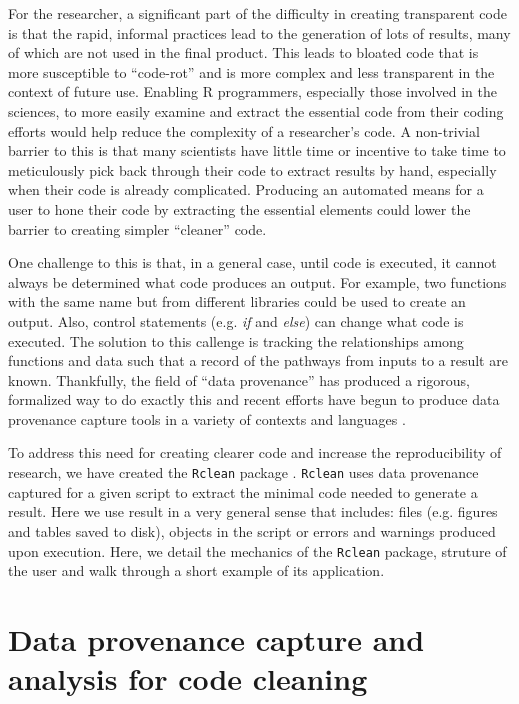 For the researcher, a significant part of the difficulty in creating
transparent code is that the rapid, informal practices lead to the
generation of lots of results, many of which are not used in the final
product. This leads to bloated code that is more susceptible to
``code-rot'' and is more complex and less transparent in the context
of future use. Enabling R programmers, especially those involved in
the sciences, to more easily examine and extract the essential code
from their coding efforts would help reduce the complexity of a
researcher's code. A non-trivial barrier to this is that many
scientists have little time or incentive to take time to meticulously
pick back through their code to extract results by hand, especially
when their code is already complicated. Producing an automated means
for a user to hone their code by extracting the essential elements
could lower the barrier to creating simpler ``cleaner'' code.

One challenge to this is that, in a general case, until code is
executed, it cannot always be determined what code produces an
output. For example, two functions with the same name but from
different libraries could be used to create an output. Also, control
statements (e.g. \emph{if} and \emph{else}) can change what code is
executed. The solution to this callenge is tracking the relationships
among functions and data such that a record of the pathways from
inputs to a result are known. Thankfully, the field of ``data
provenance'' has produced a rigorous, formalized way to do exactly
this and recent efforts have begun to produce data provenance capture
tools in a variety of contexts and languages \cite{Pasquier2017}.

To address this need for creating clearer code and increase the
reproducibility of research, we have created the \texttt{Rclean}
package \cite{Rclean}. \texttt{Rclean} uses data provenance captured
for a given script to extract the minimal code needed to generate a
result. Here we use result in a very general sense that includes:
files (e.g. figures and tables saved to disk), objects in the script
or errors and warnings produced upon execution. Here, we detail the
mechanics of the \texttt{Rclean} package, struture of the user and
walk through a short example of its application. 

\section{Data provenance capture and analysis for code cleaning}


